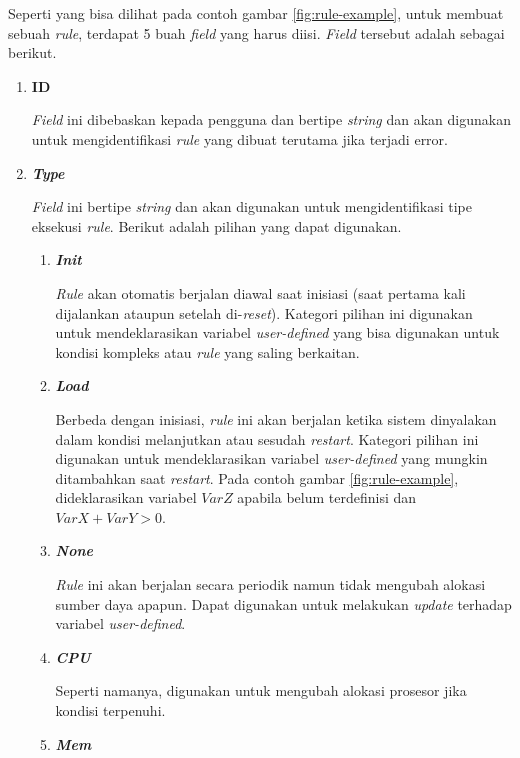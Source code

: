 Seperti yang bisa dilihat pada contoh gambar \ref{fig:rule-example}, untuk membuat sebuah \textit{rule}, terdapat 5 buah \textit{field} yang harus diisi. \textit{Field} tersebut adalah sebagai berikut.
\begin{enumerate}
    \item \textbf{ID}

        \textit{Field} ini dibebaskan kepada pengguna dan bertipe \textit{string} dan akan digunakan untuk mengidentifikasi \textit{rule} yang dibuat terutama jika terjadi error.
    \item \textbf{\textit{Type}}
    
        \textit{Field} ini bertipe \textit{string} dan akan digunakan untuk mengidentifikasi tipe eksekusi \textit{rule}. Berikut adalah pilihan yang dapat digunakan.
        \begin{enumerate}
            \item \textbf{\textit{Init}}
            
                \textit{Rule} akan otomatis berjalan diawal saat inisiasi (saat pertama kali dijalankan ataupun setelah di-\textit{reset}). Kategori pilihan ini digunakan untuk mendeklarasikan variabel \textit{user-defined} yang bisa digunakan untuk kondisi kompleks atau \textit{rule} yang saling berkaitan.

            \item \textbf{\textit{Load}}
            
                Berbeda dengan inisiasi, \textit{rule} ini akan berjalan ketika sistem dinyalakan dalam kondisi melanjutkan atau sesudah \textit{restart}. Kategori pilihan ini digunakan untuk mendeklarasikan variabel \textit{user-defined} yang mungkin ditambahkan saat \textit{restart}. Pada contoh gambar \ref{fig:rule-example}, dideklarasikan variabel $VarZ$ apabila belum terdefinisi dan $VarX+VarY > 0$.

            \item \textbf{\textit{None}}
            
                \textit{Rule} ini akan berjalan secara periodik namun tidak mengubah alokasi sumber daya apapun. Dapat digunakan untuk melakukan \textit{update} terhadap variabel \textit{user-defined}.

            \item \textbf{\textit{CPU}}

                Seperti namanya, digunakan untuk mengubah alokasi prosesor jika kondisi terpenuhi.
            \item \textbf{\textit{Mem}}
            

\end{enumerate}
\end{enumerate}

